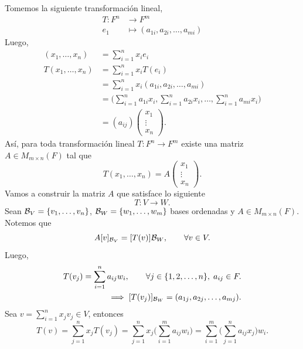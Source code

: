 \documentclass[12pt,a4paper]{book}
\newcommand{\llaves}[1]{\{#1\}}
\begin{document}
    Tomemos la siguiente transformación lineal,
    \begin{align*}
        T : F^n & \to F^m\\
        e_1 & \mapsto (a_{1i}, a_{2i}, \dots , a_{mi})
    \end{align*}
    Luego,
    \begin{align*}
        (x_1, \dots, x_n) & = \sum_{i = 1}^{n}x_ie_i\\
        T(x_1, \dots, x_n) & = \sum_{i = 1}^{n}x_iT(e_i)\\
        & = \sum_{i = 1}^{n}x_i(a_{1i}, a_{2i}, \dots, a_{mi})\\
        & = \big( \sum_{i = 1}^n a_{1i}x_i, \sum_{i = 1}^n a_{2i}x_i, \dots, \sum_{i = 1}^n a_{mi}x_i \big)\\
        & = (a_{ij})
        \begin{pmatrix}
            x_1\\
            \vdots\\
            x_n
        \end{pmatrix}.
    \end{align*}
    Así, para toda transformación lineal $T:F^n \to F^m$ existe una matriz $A \in M_{m \times n}(F)$ tal que
    \begin{equation*}
        T(x_1, \dots, x_n) = A
        \begin{pmatrix}
            x_1\\
            \vdots\\
            x_n
        \end{pmatrix}.
    \end{equation*}
    Vamos a construir la matriz $A$ que satisface lo siguiente
    \begin{equation*}
        T: V \to W.
    \end{equation*}
    Sean $\BB_V = \llaves{v_1, \dots, v_n}$, $\BB_W = \llaves{w_1, \dots, w_m}$ bases ordenadas y $A \in M_{m \times n}(F)$. Notemos que
    \begin{equation*}
        A[v]_{\mathcal{B}_V} = [T(v)]_{}\mathcal{B}_W, \qquad \forall v \in V.
    \end{equation*}
    Luego,
    \begin{align*}
        T(v_j) = \sum_{i = 1}^na_{ij}w_i, \qquad \forall j \in \llaves{1, 2, \dots, n},\; a_{ij} \in F.\\
        \implies [T(v_j)]_{\BB_W} = (a_{1j}, a_{2j}, \dots, a_{mj}).
    \end{align*}
    Sea $v = \sum_{i = 1}^n x_j v_j \in V$, entonces
    \begin{equation*}
        T(v) = \sum_{j = 1}^{n}x_j T(v_j) = \sum_{j = 1}^n x_j \big( \sum_{i = 1}^ma_{ij}w_i \big) = \sum_{i = 1}^m \big( \sum_{j = 1}^n a_{ij}x_j \big)w_i.
    \end{equation*}
\end{document}
